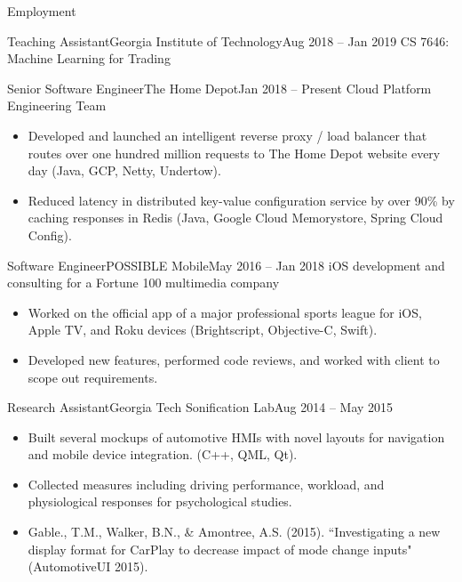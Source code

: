 \documentclass[]{mcdowellcv}
\begin{document}
	\begin{cvsection}{Employment}
		\begin{cvsubsection}{Teaching Assistant}{Georgia Institute of Technology}{Aug 2018 -- Jan 2019}
			CS 7646: Machine Learning for Trading
		\end{cvsubsection}

		\begin{cvsubsection}{Senior Software Engineer}{The Home Depot}{Jan 2018 -- Present}
			Cloud Platform Engineering Team
			\begin{itemize}
				\item Developed and launched an intelligent reverse proxy / load balancer that routes over one hundred million requests to The Home Depot website every day (Java, GCP, Netty, Undertow).
				\item Reduced latency in distributed key-value configuration service by over 90\% by caching responses in Redis (Java, Google Cloud Memorystore, Spring Cloud Config).
			\end{itemize}
		\end{cvsubsection}
		
		\begin{cvsubsection}{Software Engineer}{POSSIBLE Mobile}{May 2016 -- Jan 2018}	
			iOS development and consulting for a Fortune 100 multimedia company
			\begin{itemize}
				\item Worked on the official app of a major professional sports league for iOS, Apple TV, and Roku devices (Brightscript, Objective-C, Swift).
				\item Developed new features, performed code reviews, and worked with client to scope out requirements.
			\end{itemize}
		\end{cvsubsection}
		
		\begin{cvsubsection}{Research Assistant}{Georgia Tech Sonification Lab}{Aug 2014 -- May 2015}		
			\begin{itemize}
				\item Built several mockups of automotive HMIs with novel layouts for navigation and mobile device integration. (C++, QML, Qt).
				\item Collected measures including driving performance, workload, and physiological responses for psychological studies.
				\item Gable., T.M., Walker, B.N., \& Amontree, A.S. (2015). ``Investigating a new display format for CarPlay to decrease impact of mode change inputs" (AutomotiveUI 2015).
			\end{itemize}
		\end{cvsubsection}
		

\end{cvsection}
\end{document}
